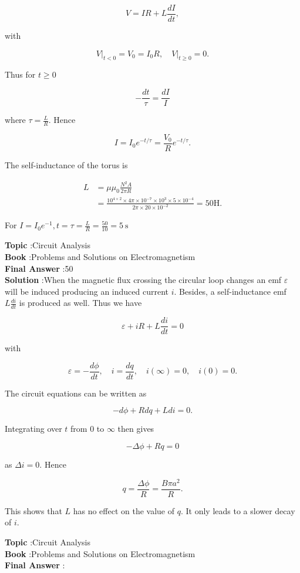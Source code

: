 \documentclass[10pt]{article}
\begin{document}
$$
V=I R+L \frac{d I}{d t},
$$

with

$$
\left.V\right|_{t<0}=V_{0}=I_{0} R,\left.\quad V\right|_{t \geq 0}=0 .
$$

Thus for $t \geq 0$

$$
-\frac{d t}{\tau}=\frac{d I}{I}
$$

where $\tau=\frac{L}{R}$. Hence

$$
I=I_{0} e^{-t / \tau}=\frac{V_{0}}{R} e^{-t / \tau} .
$$

The self-inductance of the torus is

$$
\begin{aligned}
L &=\mu \mu_{0} \frac{N^{2} A}{2 \pi R} \\
&=\frac{10^{4 \times 2} \times 4 \pi \times 10^{-7} \times 10^{3} \times 5 \times 10^{-4}}{2 \pi \times 20 \times 10^{-2}}=50 \mathrm{H} .
\end{aligned}
$$

For $I=I_{0} e^{-1}, t=\tau=\frac{L}{R}=\frac{50}{10}=5 \mathrm{~s}$

\textbf{Topic} :Circuit Analysis\\
\textbf{Book} :Problems and Solutions on Electromagnetism\\
\textbf{Final Answer} :50 \\


\textbf{Solution} :When the magnetic flux crossing the circular loop changes an emf $\varepsilon$ will be induced producing an induced current $i$. Besides, a self-inductance emf $L \frac{d i}{d t}$ is produced as well. Thus we have

$$
\varepsilon+i R+L \frac{d i}{d t}=0
$$

with

$$
\varepsilon=-\frac{d \phi}{d t}, \quad i=\frac{d q}{d t}, \quad i(\infty)=0, \quad i(0)=0 .
$$

The circuit equations can be written as

$$
-d \phi+R d q+L d i=0 .
$$

Integrating over $t$ from 0 to $\infty$ then gives

$$
-\Delta \phi+R q=0
$$

as $\Delta i=0$. Hence

$$
q=\frac{\Delta \phi}{R}=\frac{B \pi a^{2}}{R} .
$$

This shows that $L$ has no effect on the value of $q$. It only leads to a slower decay of $i$.


\textbf{Topic} :Circuit Analysis\\
\textbf{Book} :Problems and Solutions on Electromagnetism\\
\textbf{Final Answer} :\\
\end{document}

